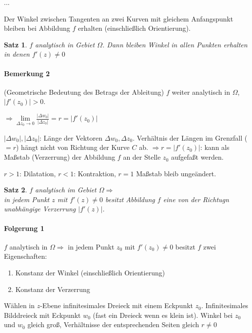 \documentclass[ngerman,halfparskip]{scrartcl}
\newtheorem{satz}{Satz}[section]
\theoremstyle{definition}
\begin{document}
...

Der Winkel zwischen Tangenten an zwei Kurven mit gleichem Anfangspunkt bleiben bei Abbildung $f$ erhalten (einschließlich Orientierung).

\begin{satz}
$f$ analytisch in Gebiet $\Omega$. Dann bleiben Winkel in allen Punkten erhalten in denen $f'(z)\neq 0$ 
\end{satz}

\paragraph{Bemerkung 2} (Geometrische Bedeutung des Betrags der Ableitung)
$f$ weiter analytisch in $\Omega$, $|f'(z_0)|>0$. 

$\Rightarrow \lim\limits_{\Delta z_0\to 0}\frac{|\Delta w_0|}{|\Delta z_0|}=r=|f'(z_0)|$ 

${|\Delta w_0|},{|\Delta z_0|}$: Länge der Vektoren $\Delta w_0,\Delta z_0$. Verhältnis der Längen im Grenzfall ($=r$) hängt nicht von Richtung der Kurve $C$ ab. $\Rightarrow r=|f'(z_0)|$: kann als Maßstab (Verzerrung) der Abbildung $f$ an der Stelle $z_0$ aufgefaßt werden. 

$r>1$: Dilatation, $r<1$: Kontraktion, $r=1$ Maßstab bleib ungeändert.

\begin{satz}
$f$ analytisch im Gebiet $\Omega \Rightarrow $\\
in jedem Punkt $z$ mit $f'(z)\neq 0$ besitzt Abbildung $f$ eine von der Richtugn unabhängige Verzerrung $|f'(z)|$. 

\end{satz}
\paragraph{Folgerung 1}$f$ analytisch in $\Omega \Rightarrow$
in jedem Punkt $z_0$ mit $f'(z_0)\neq 0$ besitzt $f$ zwei Eigenschaften:
\begin{enumerate}
\item Konstanz der Winkel (einschließlich Orientierung)
\item Konstanz der Verzerrung
\end{enumerate}

Wählen in $z$-Ebene infinitesimales Dreieck mit einem Eckpunkt $z_0$. Infinitesimales Bilddreieck mit Eckpunkt $w_0$ (fast ein Dreieck wenn es klein ist). Winkel bei $z_0$ und $w_0$ gleich groß, Verhältnisse der entsprechenden Seiten gleich $r\neq 0$
\end{document}
